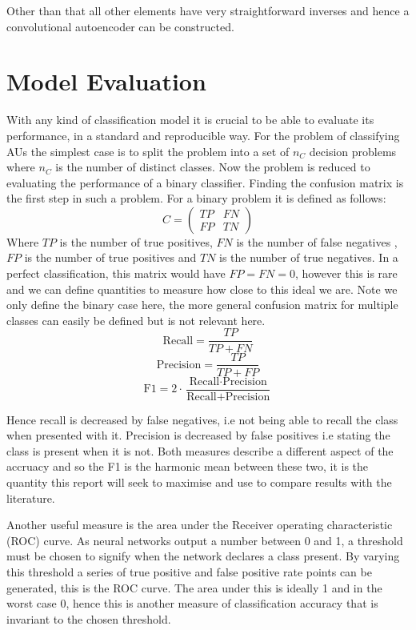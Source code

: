 \documentclass[11pt,twoside]{report}
\begin{document}
Other than that all other elements have very straightforward inverses and hence
a convolutional autoencoder can be constructed.

\section{Model Evaluation}
With any kind of classification model it is crucial to be able to evaluate its
performance, in a standard and reproducible way. For the problem of classifying
AUs the simplest case is to split the problem into a set of $n_C$ decision problems
where $n_C$ is the number of distinct classes. Now the problem is reduced to
evaluating the performance of a binary classifier. Finding the confusion matrix is
the first step in such a problem. For a binary problem it is defined as follows:
\begin{equation}
C =
\begin{pmatrix}
TP & FN\\
FP & TN
\end{pmatrix}
\end{equation}
Where $TP$ is the number of true positives, $FN$ is the number of false negatives
, $FP$ is the number of true positives and $TN$ is the number of true negatives.
In a perfect classification, this matrix would have $FP=FN=0$, however this is rare
and we can define quantities to measure how close to this ideal we are. Note we
only define the binary case here, the more general confusion matrix for multiple
classes can easily be defined but is not relevant here.
\begin{equation}
\text{Recall} = \frac{TP}{TP+FN}
\end{equation}
\begin{equation}
\text{Precision} = \frac{TP}{TP+FP}
\end{equation}
\begin{equation}
\text{F1} = 2 \cdot \frac{\text{Recall} \cdot \text{Precision}}{\text{Recall} + \text{Precision}}
\end{equation}

Hence recall is decreased by false negatives, i.e not being able to recall the class
when presented with it. Precision is decreased by false positives i.e stating the class
is present when it is not. Both measures describe a different aspect of the accruacy and so the F1 is the
harmonic mean between these two, it is the quantity this report will seek to maximise and use to compare
results with the literature.

Another useful measure is the area under the Receiver operating characteristic (ROC) curve.
As neural networks output a number between 0 and 1, a threshold must be chosen to signify
when the network declares a class present. By varying this threshold a series of true positive and false positive rate points
can be generated, this is the ROC curve. The area under this is ideally 1 and in the worst case 0, hence this is
another measure of classification accuracy that is invariant to the chosen threshold.
\end{document}
